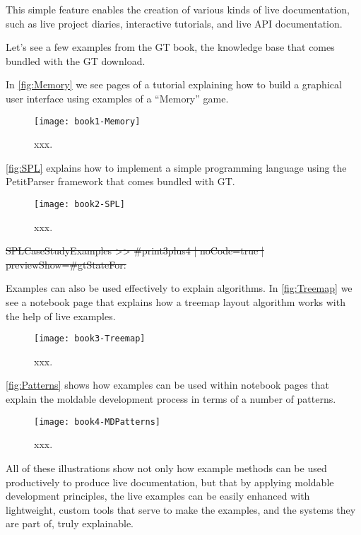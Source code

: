 \documentclass[sigplan,anonymous,review,10pt]{acmart}
\begin{document}
This simple feature enables the creation of various kinds of live documentation, such as live project diaries, interactive tutorials, and live API documentation.

Let's see a few examples from the GT book, the knowledge base that comes bundled with the GT download.

In \autoref{fig:Memory} we see pages of a tutorial explaining how to build a graphical user interface using examples of a ``Memory'' game.


\begin{figure}[h]
  \texttt{[image: book1-Memory]}
  \caption{xxx.}
  \label{fig:Memory}
\end{figure}




\autoref{fig:SPL} explains how to implement a simple programming language using the PetitParser framework that comes bundled with GT.



\begin{figure}[h]
  \texttt{[image: book2-SPL]}
  \caption{xxx.}
  \label{fig:SPL}
\end{figure}

\st{SPLCaseStudyExamples >> #print3plus4 | noCode=true | previewShow=#gtStateFor:}


Examples can also be used effectively to explain algorithms.
In \autoref{fig:Treemap} we see a notebook page that explains how a treemap layout algorithm works with the help of live examples.



\begin{figure}[h]
  \texttt{[image: book3-Treemap]}
  \caption{xxx.}
  \label{fig:Treemap}
\end{figure}




\autoref{fig:Patterns} shows how examples can be used within notebook pages that explain the moldable development process in terms of a number of patterns.


\begin{figure}[h]
  \texttt{[image: book4-MDPatterns]}
  \caption{xxx.}
  \label{fig:Patterns}
\end{figure}




All of these illustrations show not only how example methods can be used productively to produce live documentation, but that by applying moldable development principles, the live examples can be easily enhanced with lightweight, custom tools that serve to make the examples, and the systems they are part of, truly explainable.
\end{document}

